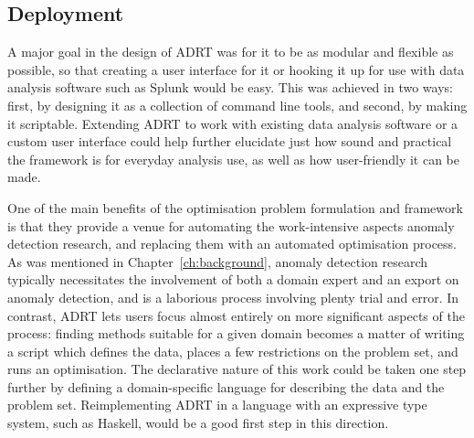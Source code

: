\subsection{Deployment}
A major goal in the design of ADRT was for it to be as modular and flexible as possible, so that creating a user interface for it or hooking it up for use with data analysis software such as Splunk would be easy. This was achieved in two ways: first, by designing it as a collection of command line tools, and second, by making it scriptable. Extending ADRT to work with existing data analysis software or a custom user interface could help further elucidate just how sound and practical the framework is for everyday analysis use, as well as how user-friendly it can be made.

One of the main benefits of the optimisation problem formulation and framework is that they provide a venue for automating the work-intensive aspects anomaly detection research, and replacing them with an automated optimisation process. As was mentioned in Chapter~\ref{ch:background}, anomaly detection research typically necessitates the involvement of both a domain expert and an export on anomaly detection, and is a laborious process involving plenty trial and error. In contrast, ADRT lets users focus almost entirely on more significant aspects of the process: finding methods suitable for a given domain becomes a matter of writing a script which defines the data, places a few restrictions on the problem set, and runs an optimisation. The declarative nature of this work could be taken one step further by defining a domain-specific language for describing the data and the problem set. Reimplementing ADRT in a language with an expressive type system, such as Haskell, would be a good first step in this direction.
